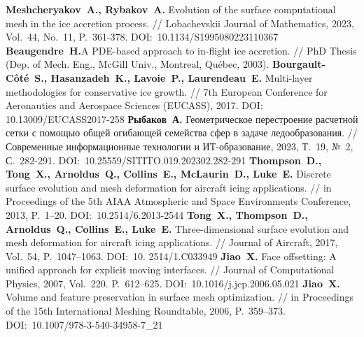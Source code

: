 \begin{thebibliography}{99}
%
\textbf{Meshcheryakov~A., Rybakov~A.} Evolution of the surface computational mesh in the ice accretion process. // Lobachevskii Journal of Mathematics, 2023, Vol.~44, No.~11, P.~361-378. DOI:~10.1134/S1995080223110367
%
\textbf{Beaugendre~H.}A PDE-based approach to in-flight ice accretion. // PhD Thesis (Dep. of Mech. Eng., McGill Univ., Montreal, Qu{\'e}bec, 2003).
%
\textbf{Bourgault-Côté~S., Hasanzadeh~K., Lavoie~P., Laurendeau~E.} Multi-layer methodologies for conservative ice growth. // 7th European Conference for Aeronautics and Aerospace Sciences (EUCASS), 2017. DOI: 10.13009/EUCASS2017-258
%
\textbf{Рыбаков~А.} Геометрическое перестроение расчетной сетки с помощью общей огибающей семейства сфер в задаче ледообразования. // Современные информационные технологии и ИТ-образование, 2023, Т.~19, №~2, С.~282-291. DOI:~10.25559/SITITO.019.202302.282-291
%
\textbf{Thompson~D., Tong~X., Arnoldus~Q., Collins~E., McLaurin~D., Luke~E.} Discrete surface evolution and mesh deformation for aircraft icing applications. // in Proceedings of the 5th AIAA Atmospheric and Space Environments Conference, 2013, P.~1–20. DOI:~10.2514/6.2013-2544
%
\textbf{Tong~X., Thompson~D., Arnoldus~Q., Collins~E., Luke~E.} Three-dimensional surface evolution and mesh deformation for aircraft icing applications. // Journal of Aircraft, 2017, Vol.~54, P.~1047–1063. DOI:~10.
2514/1.C033949
%
\textbf{Jiao~X.} Face offsetting: A unified approach for explicit moving interfaces. // Journal of Computational Physics, 2007, Vol.~220. P.~612–625. DOI:~10.1016/j.jcp.2006.05.021
%
\textbf{Jiao~X.} Volume and feature preservation in surface mesh optimization. // in Proceedings of the 15th International Meshing Roundtable, 2006, P.~359–373. DOI:~10.1007/978-3-540-34958-7\_21
%



%
%




\end{thebibliography}
